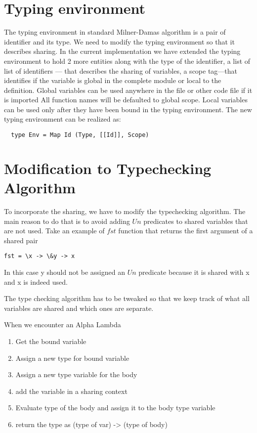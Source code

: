\section{Typing environment}

The typing environment in standard Milner-Damas algorithm
is a pair of identifier and its type.
We need to modify the typing environment so that it describes sharing.
In the current implementation we have
extended the typing environment to hold 2 more entities along with the
type of the identifier, a list of list of identifiers --- that describes the sharing of variables,
a scope tag---that identifies if the variable is global in the complete module or local to the definition.
Global variables can be used anywhere in the file or other code file if it is imported
All function names will be defaulted to global scope.
Local variables can be used only after they have been bound in the typing environment.
The new typing environment can be realized as:
\begin{verbatim}
  type Env = Map Id (Type, [[Id]], Scope)
\end{verbatim}





\section{Modification to Typechecking Algorithm}

To incorporate the sharing, we have to modify the typechecking algorithm.
The main reason to do that is to avoid adding $Un$ predicates to
shared variables that are not used. Take an example of $fst$ function
that returns the first argument of a shared pair
\begin{verbatim}
fst = \x -> \&y -> x
\end{verbatim}
In this case y should not be assigned an $Un$ predicate because
it is shared with x and x is indeed used.

The type checking algorithm has to be tweaked so that we keep track
of what all variables are shared and which ones are separate.

When we encounter an Alpha Lambda
\begin{enumerate}
\item Get the bound variable
\item Assign a new type for bound variable
\item Assign a new type variable for the body
\item add the variable in a sharing context
\item Evaluate type of the body and assign it to the body type variable
\item return the type as (type of var) -> (type of body)
\end{enumerate}



